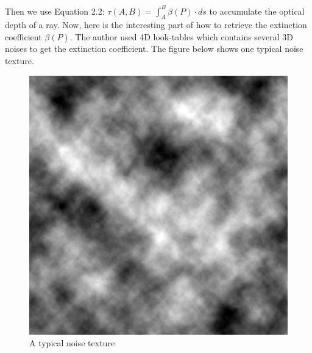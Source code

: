Then we use Equation 2.2: $\tau(A, B) = \int_{A}^{B}\beta(P)\cdot ds$ to accumulate the optical depth of a ray. Now, here is the interesting part of how to retrieve the extinction coefficient $\beta(P)$. The author used 4D look-tables which contains several 3D noises to get the extinction coefficient. The figure below shows one typical noise texture.

\begin{figure}[htp]
\begin{center}
\includegraphics[scale=0.1]{images/Noise.png}
\caption{A typical noise texture}
\label{f10}
\end{center}
\end{figure}

